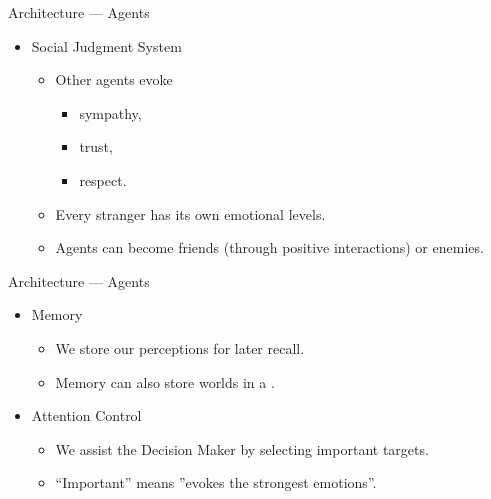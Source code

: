    \begin{frame}{Architecture --- Agents}
      \begin{itemize}
         \item {Social Judgment System}
         \begin{itemize}
            \item Other agents evoke
            \begin{itemize}
               \item sympathy,
               \item trust,
               \item respect.
            \end{itemize}
            \pause
            \item Every stranger has its own emotional levels.
            \item Agents can become friends (through positive interactions) or enemies.
         \end{itemize}
      \end{itemize}
      
   \end{frame}
   
   \begin{frame}{Architecture --- Agents}
      \begin{itemize}
         \item Memory
         \begin{itemize}
            \item We store our perceptions for later recall.
            \item Memory can also store  worlds in a .
         \end{itemize}
         \pause
         \item Attention Control
         \begin{itemize}
            \item We assist the Decision Maker by selecting important targets.
            \item ``Important'' means ''evokes the strongest emotions''.
         \end{itemize}
      \end{itemize}
      
   \end{frame}
   
